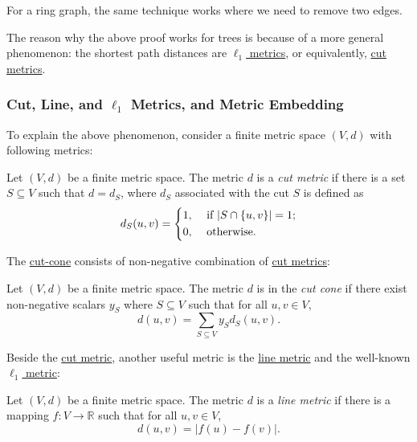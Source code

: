 \begin{eg}[Ring]
	For a ring graph, the same technique works where we need to remove two edges.
\end{eg}

The reason why the above proof works for trees is because of a more general phenomenon: the shortest path distances are \hyperref[def:l1-metric]{\(\ell _1\) metrics}, or equivalently, \hyperref[def:cut-metric]{cut metrics}.

\subsubsection{Cut, Line, and \(\ell _1\) Metrics, and Metric Embedding}
To explain the above phenomenon, consider a finite metric space \((V, d)\) with following metrics:

\begin{definition}\label{def:cut-metric}
	Let \((V, d)\) be a finite metric space. The metric \(d\) is a \emph{cut metric} if there is a set \(S \subseteq V\) such that \(d = d_S\), where \(d_S\) associated with the cut \(S\) is defined as
	\[
		d_S(u, v)
		= \begin{dcases}
			1, & \text{ if } \lvert S \cap \{ u, v \}  \rvert = 1 ; \\
			0, & \text{ otherwise} .
		\end{dcases}
	\]
\end{definition}

The \hyperref[def:cut-cone]{cut-cone} consists of non-negative combination of \hyperref[def:cut-metric]{cut metrics}:

\begin{definition}\label{def:cut-cone}
	Let \((V, d)\) be a finite metric space. The metric \(d\) is in the \emph{cut cone} if there exist non-negative scalars \(y_S\) where \(S \subseteq V\) such that for all \(u, v \in V\),
	\[
		d(u, v)
		= \sum_{S \subseteq V} y_S d_S(u, v).
	\]
\end{definition}

Beside the \hyperref[def:cut-metric]{cut metric}, another useful metric is the \hyperref[def:line-metric]{line metric} and the well-known \hyperref[def:l1-metric]{\(\ell _1\) metric}:

\begin{definition}\label{def:line-metric}
	Let \((V, d)\) be a finite metric space. The metric \(d\) is a \emph{line metric} if there is a mapping \(f \colon V \to \mathbb{R} \) such that for all \(u, v \in V\),
	\[
		d(u, v)
		= \lvert f(u) - f(v) \rvert .
	\]
\end{definition}

